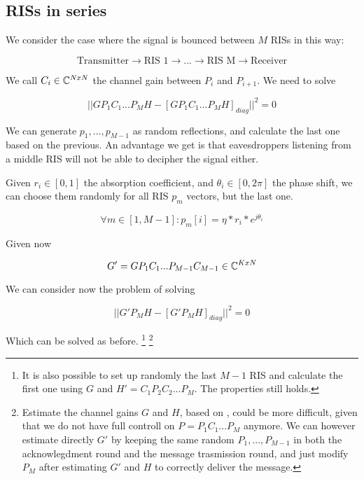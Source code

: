 \subsection{RISs in series}

We consider the case where the signal is bounced between $M$ RISs in this way:

\begin{equation}
  \text{Transmitter} \rightarrow \text{RIS 1} \rightarrow ... \rightarrow \text{RIS M} \rightarrow \text{Receiver}
\end{equation}

We call $C_i \in \mathbb{C}^{NxN}$ the channel gain between $P_i$ and $P_{i+1}$. We need to solve

\begin{equation}
  || GP_1C_1...P_MH - [GP_1C_1...P_MH]_{diag} || ^2 = 0
\end{equation}

We can generate $p_1, ..., p_{M-1}$ as random reflections, and calculate the last one based on the previous. An advantage we get is that eavesdroppers listening from a middle RIS will not be able to decipher the signal either.

Given $r_i \in [0, 1]$ the absorption coefficient, and $\theta_i \in [0, 2\pi]$ the phase shift, we can choose them randomly for all RIS $p_m$ vectors, but the last one.

\begin{equation}
  \forall m \in [1, M-1] : p_m[i] = \eta * r_i * e^{j\theta_i}
\end{equation}

Given now

\begin{equation}
  G' = GP_1C_1...P_{M-1}C_{M-1} \in \mathbb{C}^{KxN}
\end{equation}

We can consider now the problem of solving

\begin{equation}
  || G'P_MH - [G'P_MH]_{diag} || ^2 = 0
\end{equation}

Which can be solved as before.
\footnote{It is also possible to set up randomly the last $M-1$ RIS and calculate the first one using $G$ and $H'=C_1P_2C_2...P_M$. The properties still holds.}
\footnote{Estimate the channel gains $G$ and $H$, based on \cite{8879620}, could be more difficult, given that we do not have full controll on $P=P_1C_1...P_M$ anymore. We can however estimate directly $G'$ by keeping the same random $P_1, ..., P_{M-1}$ in both the acknowlegdment round and the message trasmission round, and just modify $P_M$ after estimating $G'$ and $H$ to correctly deliver the message.}

